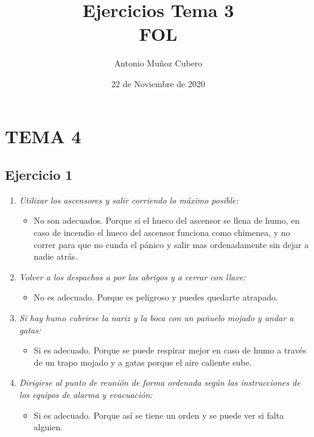 \documentclass{article}
\title{Ejercicios Tema 3 \\ \textbf{FOL}}
\author{Antonio Muñoz Cubero}
\date{22 de Noviembre de 2020}
\begin{document}
  \maketitle
    \tableofcontents
        

  \newpage
    \section{TEMA 4}
      \subsection{Ejercicio 1}
        \begin{enumerate}[label=(\alph*)]
          \item \textit{Utilizar los ascensores y salir corriendo lo máximo posible:}
            \begin{itemize}
              \item No son adecuados. Porque si el hueco del ascensor se llena de humo, en caso de incendio el hueco del ascensor funciona como chimenea, y no correr para que no cunda el pánico y salir mas ordenadamente sin dejar a nadie atrás.
            \end{itemize}
          \item \textit{Volver a los despachos a por los abrigos y a cerrar con llave:}
            \begin{itemize}
              \item No es adecuado. Porque es peligroso y puedes quedarte atrapado.
            \end{itemize}
          \item \textit{Si hay humo cubrirse la nariz y la boca con un pañuelo mojado y andar a gatas:}
            \begin{itemize}
              \item Si es adecuado. Porque se puede respirar mejor en caso de humo a través de un trapo mojado y a gatas porque el aire caliente sube.
            \end{itemize}
          \item \textit{Dirigirse al punto de reunión de forma ordenada según las instrucciones de los equipos de alarma y evacuación:}
            \begin{itemize}
              \item Si es adecuado. Porque así se tiene un orden y se puede ver si falta alguien.

\end{itemize}
\end{enumerate}
\end{document}
